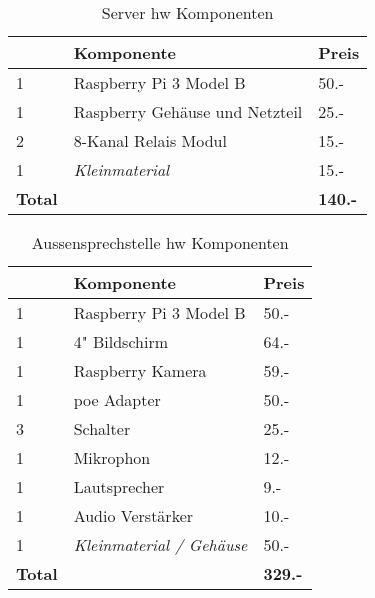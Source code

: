 \begin{table}[]
	\centering
	\label{my-label}
	\begin{tabular}{l|ll}
		\multicolumn{1}{r|}{} \textbf{Anzahl} & \textbf{Komponente} \hspace{180pt} & \textbf{Preis} 	\\ \hline
		1	&	Raspberry Pi 3 Model B						& 50.-				\\ \hline
		1	&	Raspberry Gehäuse und Netzteil				& 25.-			\\ \hline
		2	&	8-Kanal Relais Modul						& 15.-			\\ \hline
		1	&	\textit{Kleinmaterial}						& 15.-			\\ \hline
		\textbf{Total}	&									& \textbf{140.-}			\\ \hline
	\end{tabular}
	\caption{Server \gls{hw} Komponenten}
	\label{tbl:SrvHW}
\end{table}

\begin{table}[]
	\centering
	\label{my-label}
	\begin{tabular}{l|ll}
		\multicolumn{1}{r|}{} \textbf{Anzahl} & \textbf{Komponente} \hspace{180pt} & \textbf{Preis} 	\\ \hline
		1	&	Raspberry Pi 3 Model B		   				& 50.-			\\ \hline
		1	&	4" Bildschirm								& 64.-			\\ \hline
		1	&	Raspberry Kamera							& 59.-			\\ \hline
		1	&	\gls{poe} Adapter									& 50.-			\\ \hline
		3	&	Schalter									& 25.-			\\ \hline
		1	&	Mikrophon									& 12.-			\\ \hline
		1	&	Lautsprecher								& 9.-			\\ \hline
		1	&	Audio Verstärker							& 10.-			\\ \hline
		1	&	\textit{Kleinmaterial / Gehäuse}			& 50.-			\\ \hline
		\textbf{Total}	&									& \textbf{329.-}			\\ \hline
	\end{tabular}
	\caption{Aussensprechstelle \gls{hw} Komponenten}
	\label{tbl:DoorHW}
\end{table}


